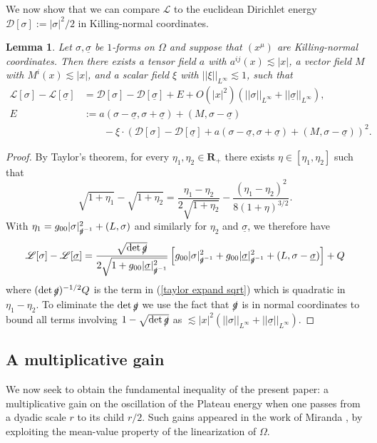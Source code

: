 \documentclass[reqno,12pt,letterpaper]{amsart}
\newcommand{\RR}{\mathbf{R}}
\newcommand{\Lagrange}{\mathscr L}
\newcommand{\DirL}{\mathscr D}
\newtheorem{lemma}[theorem]{Lemma}
\theoremstyle{definition}
\numberwithin{equation}{section}
\begin{document}
We now show that we can compare $\Lagrange$ to the euclidean Dirichlet energy $\DirL[\sigma] := |\sigma|^2/2$ in Killing-normal coordinates.

\begin{lemma}
Let $\sigma, \underline \sigma$ be $1$-forms on $\Omega$ and suppose that $(x^\mu)$ are Killing-normal coordinates.
Then there exists a tensor field $a$ with $a^{ij}(x) \lesssim |x|$, a vector field $M$ with $M^i(x) \lesssim |x|$, and a scalar field $\xi$ with $||\xi||_{L^\infty} \lesssim 1$, such that
\begin{align*}
\Lagrange[\sigma] - \Lagrange[\underline \sigma]
&= \DirL[\sigma] - \DirL[\underline \sigma] + E + O(|x|^2)(||\sigma||_{L^\infty} + ||\underline \sigma||_{L^\infty}),\\
E &:= a(\sigma - \underline \sigma, \sigma + \underline \sigma) + (M, \sigma - \underline \sigma) \\
&\qquad - \xi \cdot (\DirL[\sigma] - \DirL[\underline \sigma] + a(\sigma - \underline \sigma, \sigma + \underline \sigma) + (M, \sigma - \underline \sigma))^2.
\end{align*}
\end{lemma}
\begin{proof}
By Taylor's theorem, for every $\eta_1, \eta_2 \in \RR_+$ there exists $\eta \in [\eta_1, \eta_2]$ such that
\begin{equation}\label{taylor expand sqrt}
\sqrt{1 + \eta_1} - \sqrt{1 + \eta_2} = \frac{\eta_1 - \eta_2}{2\sqrt{1 + \eta_2}} - \frac{(\eta_1 - \eta_2)^2}{8(1 + \eta)^{3/2}}.
\end{equation}
With $\eta_1 = g_{00} |\sigma|_{\slashed g^{-1}}^2 + (L, \sigma)$ and similarly for $\eta_2$ and $\underline \sigma$, we therefore have
$$\Lagrange[\sigma] - \Lagrange[\underline \sigma] = \frac{\sqrt{\det \slashed g}}{2\sqrt{1 + g_{00}|\underline \sigma|_{\slashed g^{-1}}^2}} \left[g_{00}|\sigma|_{\slashed g^{-1}}^2 + g_{00} |\underline \sigma|_{\slashed g^{-1}}^2 + (L, \sigma - \underline \sigma)\right] + Q$$
where $(\det \slashed g)^{-1/2}Q$ is the term in (\ref{taylor expand sqrt}) which is quadratic in $\eta_1 - \eta_2$.
To eliminate the $\det \slashed g$ we use the fact that $\slashed g$ is in normal coordinates to bound all terms involving $1 - \sqrt{\det \slashed g}$ as $\lesssim |x|^2 (||\sigma||_{L^\infty} + ||\underline \sigma||_{L^\infty})$.
\end{proof}

\subsection{A multiplicative gain}
We now seek to obtain the fundamental inequality of the present paper: a multiplicative gain on the oscillation of the Plateau energy when one passes from a dyadic scale $r$ to its child $r/2$.
Such gains appeared in the work of Miranda \cite[Teorema 4.3]{Miranda66}, by exploiting the mean-value property of the linearization of $\Omega$.
\end{document}

